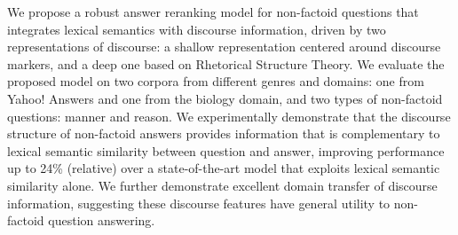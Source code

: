 We propose a robust answer reranking model for non-factoid questions that integrates lexical semantics with discourse information, driven by two representations of discourse: a shallow representation centered around discourse markers, and a deep one based on Rhetorical Structure Theory. We evaluate the proposed model on two corpora from different genres and domains: one from Yahoo! Answers and one from the biology domain, and two types of non-factoid questions: manner and reason. We experimentally demonstrate that the discourse structure of non-factoid answers provides information that is complementary to lexical semantic similarity between question and answer, improving performance up to 24\% (relative) over a state-of-the-art model that exploits lexical semantic similarity alone. We further demonstrate excellent domain transfer of discourse information, suggesting these discourse features have general utility to non-factoid question answering.
